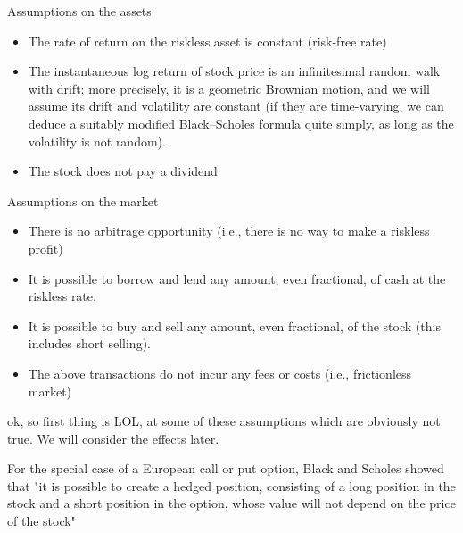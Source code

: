 \documentclass[10pt,landscape]{article}
\begin{document}
\begin{multicols}{3}
\vspace{0.15cm}

Assumptions on the assets

\vspace{0.15cm}

\begin{itemize}
	\item  The rate of return on the riskless asset is constant (risk-free rate)
	\item  The instantaneous log return of stock price is an infinitesimal random walk with drift; more precisely, it is a geometric Brownian motion, and we will assume its drift and volatility are constant (if they are time-varying, we can deduce a suitably modified Black–Scholes formula quite simply, as long as the volatility is not random).
	\item The stock does not pay a dividend
\end{itemize}

\vspace{0.15cm}

Assumptions on the market

\vspace{0.15cm}

\begin{itemize}
	\item There is no arbitrage opportunity (i.e., there is no way to make a riskless profit)
	\item It is possible to borrow and lend any amount, even fractional, of cash at the riskless rate.
	\item It is possible to buy and sell any amount, even fractional, of the stock (this includes short selling).
	\item The above transactions do not incur any fees or costs (i.e., frictionless market)
\end{itemize}

\vspace{0.15cm}

ok, so first thing is LOL, at some of these assumptions which are obviously not true. We will consider the effects later. 

\vspace{0.15cm}

 For the special case of a European call or put option, Black and Scholes showed that "it is possible to create a hedged position, consisting of a long position in the stock and a short position in the option, whose value will not depend on the price of the stock"
 

\end{multicols}
\end{document}
